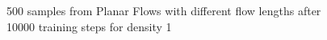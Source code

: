 \documentclass[]{article}
\begin{document}
\begin{figure}
	\centering
	\\
	\\
	\caption{500 samples from Planar Flows with different flow lengths after 10000 training steps for density 1}
	\label{fig:density1}
\end{figure}
\end{document}
